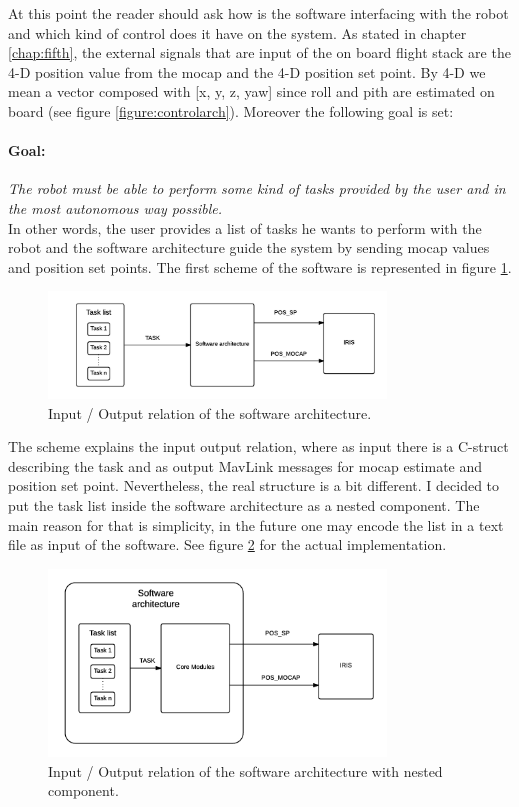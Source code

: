 At this point the reader should ask how is the software interfacing with the robot and which kind of control does it have on the system. As stated in chapter \ref{chap:fifth}, the external signals that are input of the on board flight stack are the 4-D position value from the mocap and the 4-D position set point. By 4-D we mean a vector composed with [x, y, z, yaw] since roll and pith are estimated on board (see figure \ref{figure:controlarch}). Moreover the following goal is set:
\paragraph{Goal:} \textit{The robot must be able to perform some kind of tasks provided by the user and in the most autonomous way possible.} \\

\noindent
In other words, the user provides a list of tasks he wants to perform with the robot and the software architecture guide the system by sending mocap values and position set points. The first scheme of the software is represented in figure \ref{figure:inout}. 
\begin{figure}[h]
\centering
 \includegraphics[width=0.8\textwidth]{first_arch.png}
 \caption[In-out relation]{Input / Output relation of the software architecture.}
 \label{figure:inout}
\end{figure}
The scheme explains the input output relation, where as input there is a C-struct describing the task and as output MavLink messages for mocap estimate and position set point. Nevertheless, the real structure is a bit different. I decided to put the task list inside the software architecture as a nested component. The main reason for that is simplicity, in the future one may encode the list in a text file as input of the software. See figure \ref{figure:inoutnest} for the actual implementation.

\begin{figure}[h]
\centering
 \includegraphics[width=0.8\textwidth]{nested_arch.png}
 \caption[In-out relation for the nested arch]{Input / Output relation of the software architecture with nested component.}
 \label{figure:inoutnest}
\end{figure}

